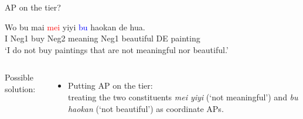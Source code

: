 \documentclass[professionalfonts, xcolor={usenames,svgnames,x11names,table}]{beamer}
\begin{document}
 \begin{frame}{AP on the tier?}
\begin{exe}
\ex \label{mylabel1}\gll Wo  bu  mai  \textcolor{red}{mei}  yiyi  \textcolor{blue}{bu}  haokan  de  hua. \\
                     I  Neg1  buy  Neg2  meaning  Neg1  beautiful  DE  painting \\
                \glt `I do not buy paintings that are not meaningful nor beautiful.'
\end{exe}

\pause
\begin{columns}

\pause
{}
Possible solution:\\
\begin{itemize}
\item Putting AP on the tier: \\treating the two constituents \textit{mei yiyi} (`not meaningful') and \textit{bu haokan} (`not beautiful') as coordinate APs. 
\end{itemize}

\end{columns}
\end{frame}
\end{document}
